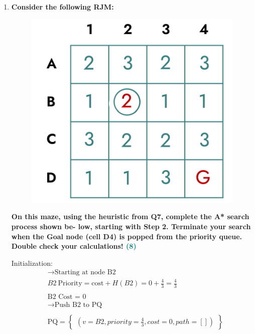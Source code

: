 \documentclass[a4paper]{article}
\begin{document}
\begin{sloppypar}
\begin{enumerate}[start=6,label=Q\arabic*,left=0pt]
    \item \textbf{Consider the following RJM:}
    \begin{figure}[H]
        \centering  
        \includegraphics[height=0.2\textheight]{Q8_RJM.png}
        \label{fig:Q8_RJM}
    \end{figure}
    \textbf{On this maze, using the heuristic from Q7, complete the A* search process shown be- low, starting with Step 2. Terminate your search when the Goal node (cell D4) is popped from the priority queue. Double check your calculations! \hfill \textcolor{teal}{(8)}}
    
    \par Initialization:
    \begin{align*}\
        &\rightarrow \text{Starting at node B2} \\
        &B2 \: \text{Priority} = \text{cost} + H(B2) = 0 + \frac{4}{3} = \frac{4}{3} \\\\
        &\text{B2 Cost = 0} \\
        &\rightarrow \text{Push B2 to PQ} \\\\
        &\text{PQ} = \left\{\begin{array}{l}
            (v=B2, priority=\frac{4}{3}, cost=0, path=[])
        \end{array}\right\}
    \end{align*}


\end{enumerate}
\end{sloppypar}
\end{document}
